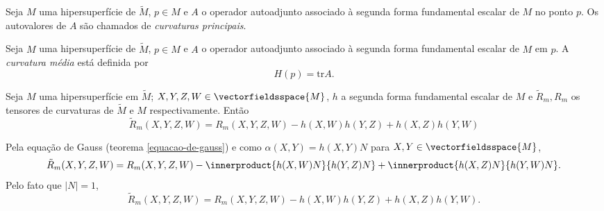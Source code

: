 \begin{definicao}
	Seja $M$ uma hipersuperfície de $\tilde{M}$,
	$p \in M$ e
	$A$ o operador autoadjunto associado à segunda forma fundamental escalar de $M$ no ponto $p$.
	Os autovalores de $A$ são chamados de \emph{curvaturas principais}.
\end{definicao}


\begin{definicao}\label{def:curvatura-media}
	Seja $M$ uma hipersuperfície de $\tilde{M}$,
	$p \in M$ e
	$A$ o operador autoadjunto associado à segunda forma fundamental escalar de $M$ em $p$.
	A \emph{curvatura média} está definida por
	\begin{equation*}
	H(p) = \text{tr} A.
	\end{equation*}
\end{definicao}

\begin{corolario}\label{equacao-de-gauss-hipersuperficies}
	Seja $M$ uma hipersuperfície em $\tilde{M}$;
	$X,Y,Z,W \in \vectorfieldsspace{M}$,
	$h$ a segunda forma fundamental escalar de $M$ e
	$\tilde{R}_m, R_m$ os tensores de curvaturas de $\tilde{M}$ e $M$ respectivamente.
	Então
	\begin{equation*}
	\tilde{R}_m(X,Y,Z,W) = R_m(X,Y,Z,W) - h(X,W) h(Y,Z) + h(X,Z) h(Y,W)
	\end{equation*}
\end{corolario}

\begin{demonstracao}
	Pela equação de Gauss (teorema \ref{equacao-de-gauss}) e como $\alpha(X,Y)= h(X,Y) N$ para $X,Y \in \vectorfieldsspace{M}$,
	\begin{equation*}
	\tilde{R}_m(X,Y,Z,W) = R_m(X,Y,Z,W) - \innerproduct{h(X,W) N}{h(Y,Z) N} + \innerproduct{h(X,Z)N}{h(Y,W)N}.
	\end{equation*}
	Pelo fato que $|N|=1$,
	\begin{equation*}
	\tilde{R}_m(X,Y,Z,W) = R_m(X,Y,Z,W) - h(X,W) h(Y,Z) + h(X,Z) h(Y,W).
	\end{equation*}
\end{demonstracao}

